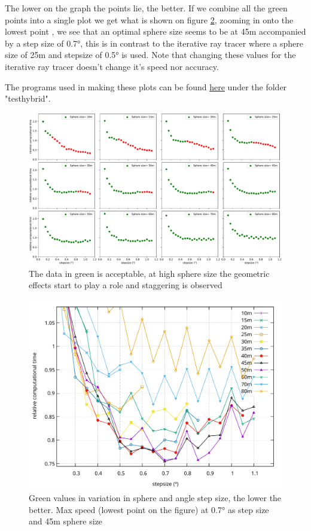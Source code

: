 The lower on the graph the points lie, the better. If we combine all the green points into a single plot
we get what is shown on figure \ref{fig:SphereStepFinal},
zooming in onto the lowest point , we see that an optimal sphere size seems to be at 45m accompanied
by a step size of 0.7°, this is in contrast to the iterative ray tracer where a sphere size of 25m and stepsize
of 0.5° is used. Note that changing these values for the iterative ray tracer doesn't change it's speed nor accuracy.

The programs used in making these plots can be found \href{https://github.com/arthuradriaens-code/projects-mt}{here}
under the folder "testhybrid".
\begin{figure}
\includegraphics[width=\textwidth]{figures/subplotofallstepsphere.pdf}
\caption{The data in green is acceptable, at high sphere size the geometric effects start to play a role and staggering is observed}
\label{fig:SphereStepInfl}
\end{figure}
\begin{figure}
\includegraphics[width=\textwidth]{figures/SphereAndStepFinal.pdf}
\caption{Green values in variation in sphere and angle step size, the lower the better. Max speed (lowest point on the figure) at 0.7° as step size and 45m sphere size}
	\label{fig:SphereStepFinal}
\end{figure}
\newpage
